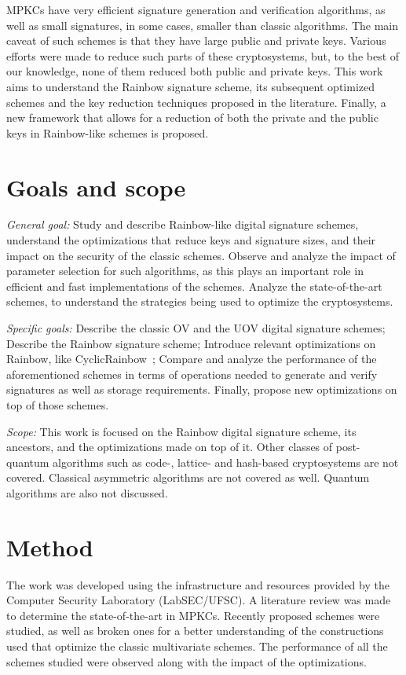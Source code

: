 \documentclass{ufsctex/ufsctex}
\begin{document}
MPKCs have very efficient signature generation and verification algorithms, as
well as small signatures, in some cases, smaller than classic algorithms. The
main caveat of such schemes is that they have large public and private keys.
Various efforts were made to reduce such parts of these cryptosystems, but, to
the best of our knowledge, none of them reduced both public and private keys.
This work aims to understand the Rainbow signature scheme, its subsequent
optimized schemes and the key reduction techniques proposed in the literature.
Finally, a new framework that allows for a reduction of both the private and
the public keys in Rainbow-like schemes is proposed.

\section{Goals and scope}

\textit{General goal:} Study and describe Rainbow-like digital signature
schemes, understand the optimizations that reduce keys and signature sizes, and
their impact on the security of the classic schemes. Observe and analyze the
impact of parameter selection for such algorithms, as this plays an important
role in efficient and fast implementations of the schemes. Analyze the
state-of-the-art schemes, to understand the strategies being used to optimize
the cryptosystems.

\textit{Specific goals:} Describe the classic OV and the UOV digital signature
schemes; Describe the Rainbow signature scheme; Introduce relevant
optimizations on Rainbow, like CyclicRainbow~\cite{petzoldt2010cyclicrainbow};
Compare and analyze the performance of the aforementioned schemes in terms of
operations needed to generate and verify signatures as well as storage
requirements. Finally, propose new optimizations on top of those schemes.

\textit{Scope:} This work is focused on the Rainbow digital signature scheme,
its ancestors, and the optimizations made on top of it. Other classes of
post-quantum algorithms such as code-, lattice- and hash-based cryptosystems
are not covered. Classical asymmetric algorithms are not covered as well.
Quantum algorithms are also not discussed.

\section{Method}

The work was developed using the infrastructure and resources provided by the
Computer Security Laboratory (LabSEC/UFSC). A literature review was made to
determine the state-of-the-art in MPKCs. Recently proposed schemes were
studied, as well as broken ones for a better understanding of the constructions
used that optimize the classic multivariate schemes. The performance of all the
schemes studied were observed along with the impact of the optimizations.
\end{document}
